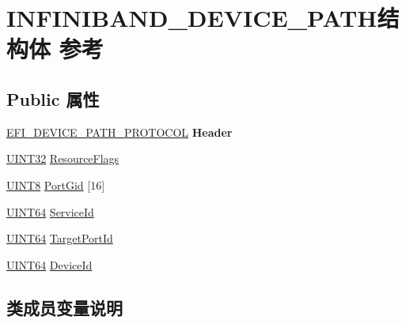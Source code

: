 \hypertarget{struct_i_n_f_i_n_i_b_a_n_d___d_e_v_i_c_e___p_a_t_h}{}\section{I\+N\+F\+I\+N\+I\+B\+A\+N\+D\+\_\+\+D\+E\+V\+I\+C\+E\+\_\+\+P\+A\+T\+H结构体 参考}
\label{struct_i_n_f_i_n_i_b_a_n_d___d_e_v_i_c_e___p_a_t_h}
\subsection*{Public 属性}
\begin{DoxyCompactItemize}
\item 
\mbox{\label{struct_i_n_f_i_n_i_b_a_n_d___d_e_v_i_c_e___p_a_t_h_a80ce0b32a0543136791fe67fd525638d}} 
\hyperlink{struct_e_f_i___d_e_v_i_c_e___p_a_t_h___p_r_o_t_o_c_o_l}{E\+F\+I\+\_\+\+D\+E\+V\+I\+C\+E\+\_\+\+P\+A\+T\+H\+\_\+\+P\+R\+O\+T\+O\+C\+OL} {\bfseries Header}
\item 
\hyperlink{_processor_bind_8h_ae1e6edbbc26d6fbc71a90190d0266018}{U\+I\+N\+T32} \hyperlink{struct_i_n_f_i_n_i_b_a_n_d___d_e_v_i_c_e___p_a_t_h_a84644d4ef82e1ca328680ca16cbc9c18}{Resource\+Flags}
\item 
\hyperlink{_processor_bind_8h_ab27e9918b538ce9d8ca692479b375b6a}{U\+I\+N\+T8} \hyperlink{struct_i_n_f_i_n_i_b_a_n_d___d_e_v_i_c_e___p_a_t_h_aba0c6b051136a462cbebc41bcba7e7d8}{Port\+Gid} \mbox{[}16\mbox{]}
\item 
\hyperlink{_processor_bind_8h_a57be03562867144161c1bfee95ca8f7c}{U\+I\+N\+T64} \hyperlink{struct_i_n_f_i_n_i_b_a_n_d___d_e_v_i_c_e___p_a_t_h_af1758fc49b91d39c1ea8d9447ec72095}{Service\+Id}
\item 
\hyperlink{_processor_bind_8h_a57be03562867144161c1bfee95ca8f7c}{U\+I\+N\+T64} \hyperlink{struct_i_n_f_i_n_i_b_a_n_d___d_e_v_i_c_e___p_a_t_h_a2f3db3ceab40e3bb2fee37e06ce9a0b8}{Target\+Port\+Id}
\item 
\hyperlink{_processor_bind_8h_a57be03562867144161c1bfee95ca8f7c}{U\+I\+N\+T64} \hyperlink{struct_i_n_f_i_n_i_b_a_n_d___d_e_v_i_c_e___p_a_t_h_aa6b31397fb421087e75a786cca09b7b2}{Device\+Id}
\end{DoxyCompactItemize}


\subsection{类成员变量说明}
\mbox{\label{struct_i_n_f_i_n_i_b_a_n_d___d_e_v_i_c_e___p_a_t_h_aa6b31397fb421087e75a786cca09b7b2}} 

